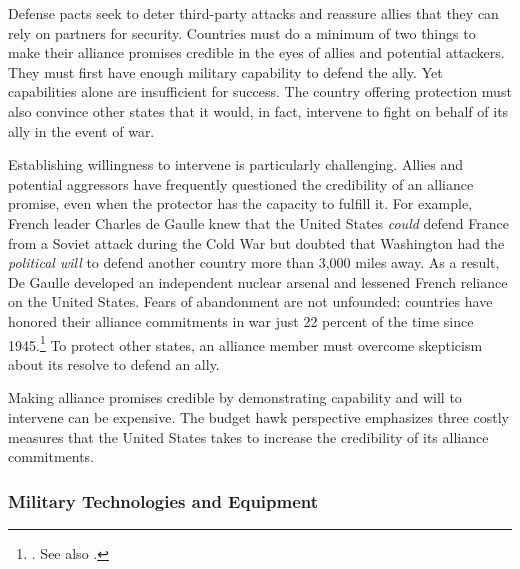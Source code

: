 Defense pacts seek to deter third-party attacks and reassure allies that they can rely on partners for security. Countries must do a minimum of two things to make their alliance promises credible in the eyes of allies and potential attackers.\autocite[On the issue of credibility in alliance politics, see, for example,][]{schellingarms66,Fearon1997,Morrow2000} They must first have enough military capability to defend the ally. Yet capabilities alone are insufficient for success. The country offering protection must also convince other states that it would, in fact, intervene to fight on behalf of its ally in the event of war. 

Establishing willingness to intervene is particularly challenging. Allies and potential aggressors have frequently questioned the credibility of an alliance promise, even when the protector has the capacity to fulfill it. For example, French leader Charles de Gaulle knew that the United States \textit{could} defend France from a Soviet attack during the Cold War but doubted that Washington had the \textit{political will} to defend another country more than 3,000 miles away. As a result, De Gaulle developed an independent nuclear arsenal and lessened French reliance on the United States. Fears of abandonment are not unfounded: countries have honored their alliance commitments in war just 22 percent of the time since 1945.\footnote{\cite{berkemeierRP18}. See also \cite{Leedsetal2000}.} To protect other states, an alliance member must overcome skepticism about its resolve to defend an ally.\autocite[36]{schellingarms66} %

Making alliance promises credible by demonstrating capability and will to intervene can be expensive. The budget hawk perspective emphasizes three costly measures that the United States takes to increase the credibility of its alliance commitments.  

\subsubsection*{Military Technologies and Equipment}

